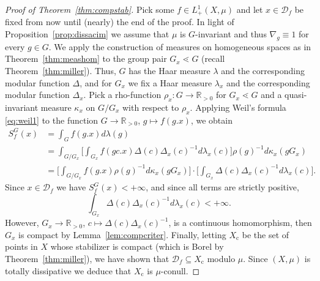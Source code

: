 \documentclass{amsart}
\numberwithin{equation}{subsection}
\begin{document}
\begin{proof}[Proof of Theorem~\ref{thm:compstab}]
Pick some \(f\in L_{+}^{1}\left(X,\mu\right)\) and let \(x\in\mathcal{D}_{f}\) be fixed from now until (nearly) the end of the proof. In light of Proposition~\ref{prop:dissacim} we assume that \(\mu\) is \(G\)-invariant and thus \(\nabla_{g}\equiv 1\) for every \(g\in G\). We apply the construction of measures on homogeneous spaces as in Theorem~\ref{thm:meashom} to the group pair \(G_{x}\lessdot G\) (recall Theorem~\ref{thm:miller}). Thus, \(G\) has the Haar measure \(\lambda\) and the corresponding modular function \(\varDelta\), and for \(G_{x}\) we fix a Haar measure \(\lambda_{x}\) and the corresponding modular function \(\varDelta_{x}\). Pick a rho-function \(\rho_{x}:G\to\mathbb{R}_{>0}\) for \(G_{x}\lessdot G\) and a quasi-invariant measure \(\kappa_{x}\) on \(G/G_{x}\) with respect to \(\rho_{x}\). Applying Weil's formula \eqref{eq:weil1} to the function \(G\to\mathbb{R}_{>0}\), \(g\mapsto f\left(g.x\right)\), we obtain
\begin{align*}
S_{f}^{G}\left(x\right)
&=\int_{G}f\left(g.x\right)d\lambda\left(g\right)\\
&=\int_{G/G_{x}}\Big[\int_{G_{x}}f\left(gc.x\right)\varDelta\left(c\right)\varDelta_{x}\left(c\right)^{-1}d\lambda_{x}\left(c\right)\Big]\rho\left(g\right)^{-1}d\kappa_{x}\left(gG_{x}\right)\\
&=\Big[\int_{G/G_{x}}f\left(g.x\right)\rho\left(g\right)^{-1}d\kappa_{x}\left(gG_{x}\right)\Big]\cdot\Big[\int_{G_{x}}\varDelta\left(c\right)\varDelta_{x}\left(c\right)^{-1}d\lambda_{x}\left(c\right)\Big].
\end{align*}
Since \(x\in\mathcal{D}_{f}\) we have \(S_{f}^{G}\left(x\right)<+\infty\), and since all terms are strictly positive,
\[\int_{G_{x}}\varDelta\left(c\right)\varDelta_{x}\left(c\right)^{-1}d\lambda_{x}\left(c\right)<+\infty.\]
However, \(G_{x}\to\mathbb{R}_{>0}\), \(c\mapsto\varDelta\left(c\right)\varDelta_{x}\left(c\right)^{-1}\), is a continuous homomorphism, then \(G_{x}\) is compact by Lemma~\ref{lem:compcriter}. Finally, letting \(X_{\mathrm{c}}\) be the set of points in \(X\) whose stabilizer is compact (which is Borel by Theorem~\ref{thm:miller}), we have shown that \(\mathcal{D}_{f}\subseteq X_{\mathrm{c}}\) modulo \(\mu\). Since \(\left(X,\mu\right)\) is totally dissipative we deduce that \(X_{\mathrm{c}}\) is \(\mu\)-conull.
\end{proof}
\end{document}
